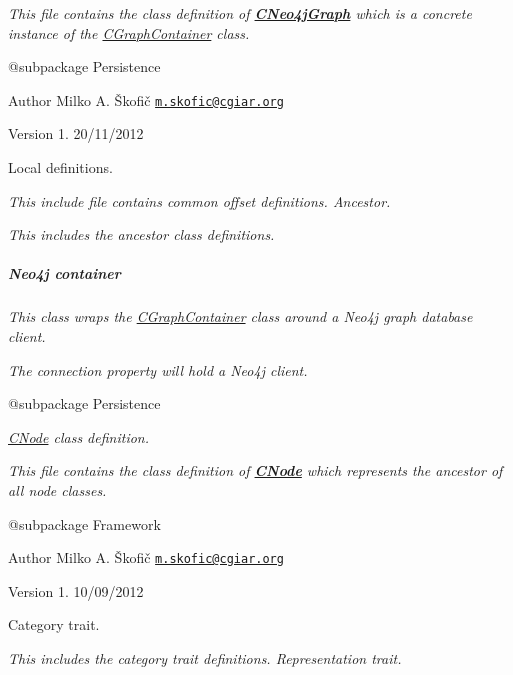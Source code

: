 {\itshape This file contains the class definition of {\bfseries \hyperlink{class_c_neo4j_graph}{C\-Neo4j\-Graph}} which is a concrete instance of the \hyperlink{class_c_graph_container}{C\-Graph\-Container} class.}

{\itshape \begin{DoxyVerb} @subpackage        Persistence
\end{DoxyVerb}
}

{\itshape \begin{DoxyAuthor}{Author}
Milko A. Škofič \href{mailto:m.skofic@cgiar.org}{\tt m.\-skofic@cgiar.\-org} 
\end{DoxyAuthor}
\begin{DoxyVersion}{Version}
1. 20/11/2012
\end{DoxyVersion}
Local definitions.}

{\itshape This include file contains common offset definitions. Ancestor.}

{\itshape This includes the ancestor class definitions. \subparagraph*{Neo4j container}}

{\itshape }

{\itshape This class wraps the \hyperlink{class_c_graph_container}{C\-Graph\-Container} class around a Neo4j graph database client.}

{\itshape The connection property will hold a Neo4j client.}

{\itshape \begin{DoxyVerb} @subpackage        Persistence\end{DoxyVerb}
}

{\itshape {\itshape \hyperlink{class_c_node}{C\-Node}} class definition.}

{\itshape This file contains the class definition of {\bfseries \hyperlink{class_c_node}{C\-Node}} which represents the ancestor of all node classes.}

{\itshape \begin{DoxyVerb} @subpackage        Framework
\end{DoxyVerb}
}

{\itshape \begin{DoxyAuthor}{Author}
Milko A. Škofič \href{mailto:m.skofic@cgiar.org}{\tt m.\-skofic@cgiar.\-org} 
\end{DoxyAuthor}
\begin{DoxyVersion}{Version}
1. 10/09/2012
\end{DoxyVersion}
Category trait.}

{\itshape This includes the category trait definitions. Representation trait.}

